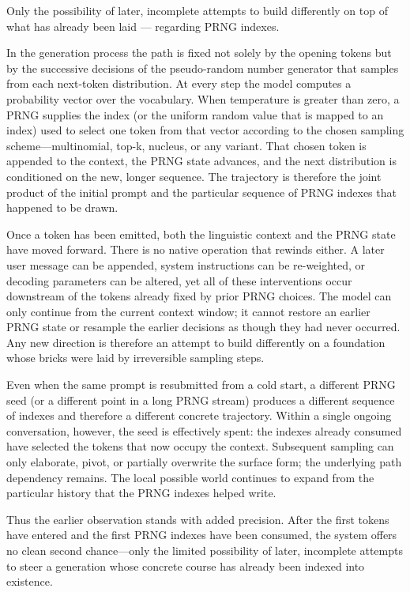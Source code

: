 Only the possibility of later, incomplete attempts to build differently on top of what has already been laid — regarding PRNG indexes.

In the generation process the path is fixed not solely by the opening tokens but by the successive decisions of the pseudo-random number generator that samples from each next-token distribution. At every step the model computes a probability vector over the vocabulary. When temperature is greater than zero, a PRNG supplies the index (or the uniform random value that is mapped to an index) used to select one token from that vector according to the chosen sampling scheme—multinomial, top-k, nucleus, or any variant. That chosen token is appended to the context, the PRNG state advances, and the next distribution is conditioned on the new, longer sequence. The trajectory is therefore the joint product of the initial prompt and the particular sequence of PRNG indexes that happened to be drawn.

Once a token has been emitted, both the linguistic context and the PRNG state have moved forward. There is no native operation that rewinds either. A later user message can be appended, system instructions can be re-weighted, or decoding parameters can be altered, yet all of these interventions occur downstream of the tokens already fixed by prior PRNG choices. The model can only continue from the current context window; it cannot restore an earlier PRNG state or resample the earlier decisions as though they had never occurred. Any new direction is therefore an attempt to build differently on a foundation whose bricks were laid by irreversible sampling steps.

Even when the same prompt is resubmitted from a cold start, a different PRNG seed (or a different point in a long PRNG stream) produces a different sequence of indexes and therefore a different concrete trajectory. Within a single ongoing conversation, however, the seed is effectively spent: the indexes already consumed have selected the tokens that now occupy the context. Subsequent sampling can only elaborate, pivot, or partially overwrite the surface form; the underlying path dependency remains. The local possible world continues to expand from the particular history that the PRNG indexes helped write.

Thus the earlier observation stands with added precision. After the first tokens have entered and the first PRNG indexes have been consumed, the system offers no clean second chance—only the limited possibility of later, incomplete attempts to steer a generation whose concrete course has already been indexed into existence.

